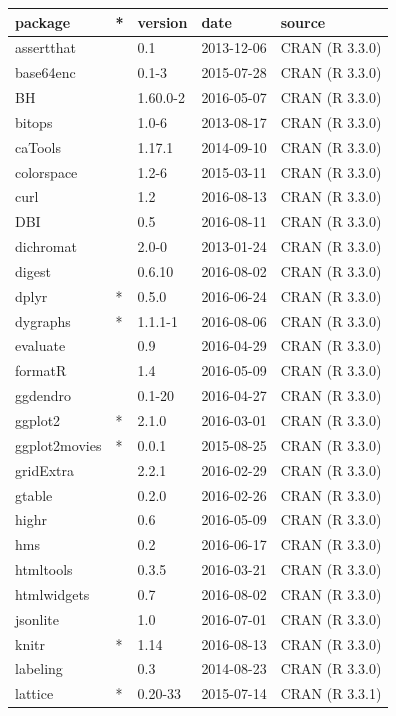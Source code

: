 \documentclass[]{tufte-book}
\begin{document}
\begin{longtable}{lllll}
\toprule
package & * & version & date & source\\
\midrule
assertthat &  & 0.1 & 2013-12-06 & CRAN (R 3.3.0)\\
base64enc &  & 0.1-3 & 2015-07-28 & CRAN (R 3.3.0)\\
BH &  & 1.60.0-2 & 2016-05-07 & CRAN (R 3.3.0)\\
bitops &  & 1.0-6 & 2013-08-17 & CRAN (R 3.3.0)\\
caTools &  & 1.17.1 & 2014-09-10 & CRAN (R 3.3.0)\\
\addlinespace
colorspace &  & 1.2-6 & 2015-03-11 & CRAN (R 3.3.0)\\
curl &  & 1.2 & 2016-08-13 & CRAN (R 3.3.0)\\
DBI &  & 0.5 & 2016-08-11 & CRAN (R 3.3.0)\\
dichromat &  & 2.0-0 & 2013-01-24 & CRAN (R 3.3.0)\\
digest &  & 0.6.10 & 2016-08-02 & CRAN (R 3.3.0)\\
\addlinespace
dplyr & * & 0.5.0 & 2016-06-24 & CRAN (R 3.3.0)\\
dygraphs & * & 1.1.1-1 & 2016-08-06 & CRAN (R 3.3.0)\\
evaluate &  & 0.9 & 2016-04-29 & CRAN (R 3.3.0)\\
formatR &  & 1.4 & 2016-05-09 & CRAN (R 3.3.0)\\
ggdendro &  & 0.1-20 & 2016-04-27 & CRAN (R 3.3.0)\\
\addlinespace
ggplot2 & * & 2.1.0 & 2016-03-01 & CRAN (R 3.3.0)\\
ggplot2movies & * & 0.0.1 & 2015-08-25 & CRAN (R 3.3.0)\\
gridExtra &  & 2.2.1 & 2016-02-29 & CRAN (R 3.3.0)\\
gtable &  & 0.2.0 & 2016-02-26 & CRAN (R 3.3.0)\\
highr &  & 0.6 & 2016-05-09 & CRAN (R 3.3.0)\\
\addlinespace
hms &  & 0.2 & 2016-06-17 & CRAN (R 3.3.0)\\
htmltools &  & 0.3.5 & 2016-03-21 & CRAN (R 3.3.0)\\
htmlwidgets &  & 0.7 & 2016-08-02 & CRAN (R 3.3.0)\\
jsonlite &  & 1.0 & 2016-07-01 & CRAN (R 3.3.0)\\
knitr & * & 1.14 & 2016-08-13 & CRAN (R 3.3.0)\\
\addlinespace
labeling &  & 0.3 & 2014-08-23 & CRAN (R 3.3.0)\\
lattice & * & 0.20-33 & 2015-07-14 & CRAN (R 3.3.1)\\

\end{longtable}
\end{document}

